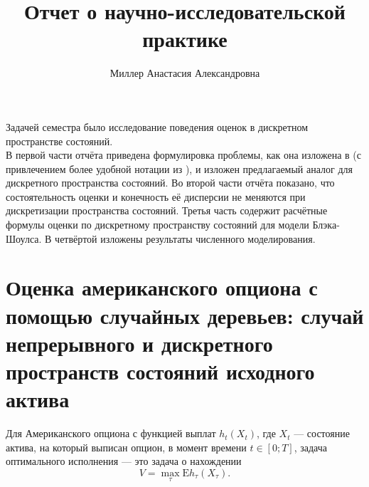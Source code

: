 \documentclass[specialist,
               substylefile = ../spbu.rtx,
               subf,href,colorlinks=true, 12pt]{disser}
\newcommand{\ev}{\mathrm{E}}
\begin{document}
%
%


\title{Отчет о научно-исследовательской практике}


\author{Миллер Анастасия Александровна}


\date{\number\year}

\maketitle
\cleardoublepage

\tableofcontents

\intro
    Задачей семестра было исследование поведения оценок \cite{Broadie1997} в дискретном пространстве состояний. \\
    В первой части отчёта приведена формулировка проблемы, как она изложена в \cite{Broadie1997} (с привлечением более удобной нотации из \cite{Kashtanov2015}), и изложен предлагаемый аналог для дискретного пространства состояний. Во второй части отчёта показано, что состоятельность оценки и конечность её дисперсии не меняются при дискретизации пространства состояний. Третья часть содержит расчётные формулы оценки по дискретному пространству состояний для модели Блэка-Шоулса. В четвёртой изложены результаты численного моделирования. 

\chapter{Оценка американского опциона с помощью случайных деревьев: случай непрерывного и дискретного пространств состояний исходного актива}
    Для Американского опциона с функцией выплат $h_t\left(X_t\right)$, где $X_t$ — состояние актива, на который выписан опцион, в момент времени $t\in\left[0;T\right]$, задача оптимального исполнения — это задача о нахождении \begin{equation}\label{eq:optimal_stopping}V = \max_{\tau} \ev h_\tau\left(X_\tau\right).\end{equation}
\end{document}
